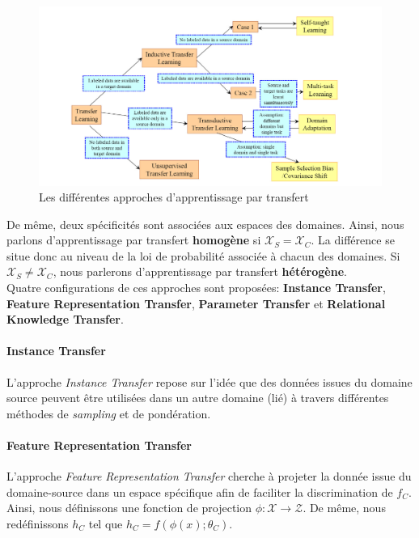 \begin{figure}
    \centering
    \includegraphics[scale=0.3]{./tex/induction/transfer_l.png}
    \caption{Les différentes approches d'apprentissage par transfert}
    \label{transfer_l_pic}
\end{figure}

\noindent De même, deux spécificités sont associées aux espaces des domaines. Ainsi, nous parlons d'apprentissage par transfert \textbf{homogène} si $\mathcal{X}_S=\mathcal{X}_C$. La différence se situe donc au niveau de la loi de probabilité associée à chacun des domaines. Si $\mathcal{X}_S \neq \mathcal{X}_C$, nous parlerons d'apprentissage par transfert \textbf{hétérogène}.\\

\noindent Quatre configurations de ces approches sont proposées: \textbf{Instance  Transfer}, \textbf{Feature Representation Transfer}, \textbf{Parameter Transfer} et \textbf{Relational Knowledge Transfer}\cite{transfer_l}.

\paragraph{Instance Transfer}

\noindent L'approche \textit{Instance Transfer} repose sur l'idée que des données issues du domaine source peuvent être utilisées dans un autre domaine (lié) à travers différentes méthodes de \textit{sampling} et de pondération.

\paragraph{Feature Representation Transfer}

\noindent L'approche \textit{Feature Representation Transfer} cherche à projeter la donnée issue du domaine-source dans un espace spécifique afin de faciliter la discrimination de $f_C$. Ainsi, nous définissons une fonction de projection $\phi: \mathcal{X} \rightarrow \mathcal{Z}$. De même, nous redéfinissons $h_C$ tel que $h_C=f(\phi(x);\theta_C)$.\\

